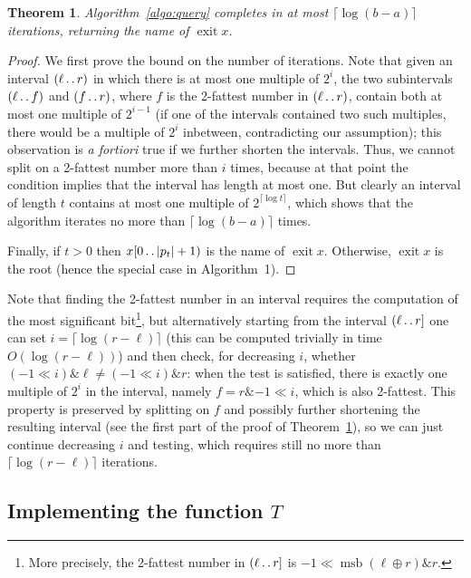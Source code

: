 \documentclass[a4paper,11pt]{article}
\newtheorem{theorem} {Theorem}[section]
\newcommand{\?}{\mskip1.5mu}
\def\..{\,\mathpunct{\ldotp\ldotp}} %
\DeclareMathOperator{\exit}{exit}
\begin{document}
\begin{theorem}
\label{thm:correctnessfbs}
Algorithm~\ref{algo:query} completes in at most $\lceil\log(b-a)\rceil$
iterations, returning the name of $\exit x$.
\end{theorem}
\begin{proof}
We first prove the bound on the number of iterations. Note that given an
interval $(\ell\..r)$ in which there is at most one multiple of $2^i$, the two
subintervals $(\ell\..f)$ and $(f\..r)$, where $f$ is the 2-fattest number in
$(\ell\..r)$, contain both at most one multiple of $2^{i-1}$ (if one of the
intervals contained two such multiples, there would be a multiple of $2^i$
inbetween, contradicting our assumption); this observation is \emph{a fortiori}
true if we further shorten the intervals. Thus, we cannot
split on a 2-fattest number more than $i$ times, because at that point the
condition implies that the interval has length at most one. But clearly an interval of length $t$ contains at most one multiple of $2^{\lceil\log t\rceil}$, which shows that the algorithm
iterates no more than $\lceil\log(b-a)\rceil$ times.

Finally, if $t>0$ then $x[0\..|p_t|+1)$ is the name of $\exit x$.
Otherwise, $\exit x$ is the root (hence the special case in Algorithm~1).
\end{proof}

Note that finding the 2-fattest number in an interval requires the computation of
the most significant bit\footnote{More precisely, the 2-fattest number in
$(\ell\..r]$ is $-1 \ll \operatorname{msb}(\ell \oplus r) \mathbin\& r$.}, but
alternatively starting from the interval $(\ell\..r]$
one can set $i=\lceil\log(r-\ell)\rceil$ (this can be computed trivially in time $O(\log(r-\ell))$)
and then check, for decreasing $i$, whether $(-1\ll i)\mathbin\& \ell \neq (-1\ll i)\mathbin\&
r$: when the test is satisfied, there is exactly one multiple of $2^i$ in the interval, 
namely $f=r \mathbin\& -1
\ll i$, which is also 2-fattest. This property is preserved by splitting on 
$f$ and possibly further shortening the resulting interval (see the first part
of the proof of Theorem~\ref{thm:correctnessfbs}), so we can just continue decreasing $i$ and testing, 
which requires still no more than $\lceil\log(r-\ell)\rceil$ iterations.

\subsection{Implementing the function $T$}
\end{document}
